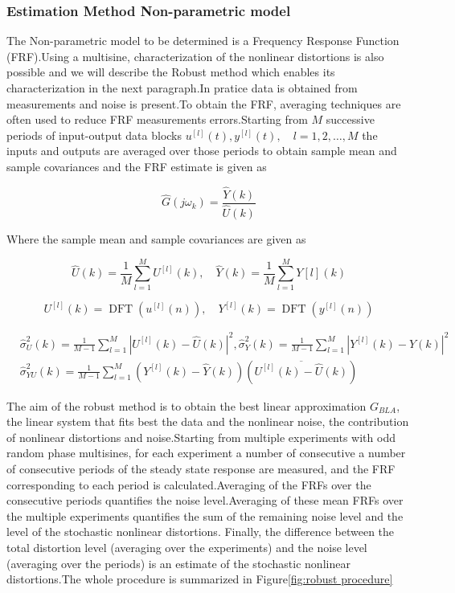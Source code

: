 \documentclass[a4paper,12pt]{article}
\numberwithin{equation}{section}
\begin{document}
\subsubsection{Estimation Method Non-parametric model}
The Non-parametric model to be determined is a Frequency Response Function (FRF).Using a multisine,  characterization of the nonlinear distortions is also possible and we will describe the Robust method which enables its characterization in the next paragraph.In pratice data is obtained from measurements and noise is present.To obtain the FRF, averaging techniques are often used to reduce FRF measurements errors.Starting from $M$ successive periods of  input-output data blocks $u^{[l]}(t), y^{[l]}(t), \quad l=1,2, \ldots, M$ the inputs and outputs are averaged over those periods to obtain sample mean and sample covariances and the FRF estimate is given as

\begin{equation}
\hat{G}\left(j \omega_{k}\right)=\frac{\hat{Y}(k)}{\hat{U}(k)}
\end{equation}

\noindent
Where the sample mean and sample covariances are given as

$$
\hat{U}(k)=\frac{1}{M} \sum_{l=1}^{M} U^{[l]}(k), \quad \hat{Y}(k)=\frac{1}{M} \sum_{l=1}^{M} Y[l](k)
$$

$$
U^{[l]}(k)=\operatorname{DFT}\left(u^{[l]}(n)\right), \quad Y^{[l]}(k)=\operatorname{DFT}\left(y^{[l]}(n)\right)
$$

\begin{equation}\label{eq:covar}
\begin{aligned}
&\hat{\sigma}_{U}^{2}(k)=\frac{1}{M-1} \sum_{l=1}^{M}\left|U^{[l]}(k)-\hat{U}(k)\right|^{2}, \hat{\sigma}_{Y}^{2}(k)=\frac{1}{M-1} \sum_{l=1}^{M}\left|Y^{[l]}(k)-\hat{Y}(k)\right|^{2} \\
&\hat{\sigma}_{Y U}^{2}(k)=\frac{1}{M-1} \sum_{l=1}^{M}\left(Y^{[l]}(k)-\hat{Y}(k)\right)\left(\overline{U^{[l]}(k)-\hat{U}(k)}\right)
\end{aligned}
\end{equation}

The aim of the robust method is to obtain the best linear approximation $G_{BLA}$, the linear system that fits best the data and the nonlinear noise, the contribution of nonlinear distortions and noise.Starting from multiple experiments with odd random phase multisines, for each experiment a number of consecutive a number of consecutive periods of the steady state response are measured, and the FRF corresponding to each period is calculated.Averaging of the FRFs over the consecutive periods quantifies the noise level.Averaging of these mean FRFs over the multiple experiments quantifies the sum of the remaining noise level and the level of the stochastic nonlinear distortions. Finally, the difference between the total distortion level (averaging over the experiments) and the noise level (averaging over the periods) is an estimate of the stochastic nonlinear distortions.The whole
procedure is summarized in Figure\ref{fig:robust procedure}
\end{document}
